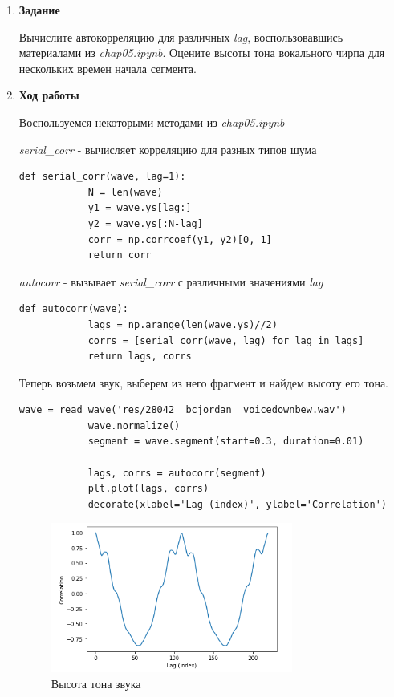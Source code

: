 \documentclass[a4paper,12pt]{article}
\begin{document}
	\begin{enumerate}
		
		
		\item \textbf{Задание}
		
		Вычислите автокорреляцию для различных \textit{lag}, воспользовавшись материалами из \textit{chap05.ipynb}. Оцените высоты тона вокального чирпа для нескольких времен начала сегмента. 
		
		\item \textbf{Ход работы}
		
		Воспользуемся некоторыми методами из \textit{chap05.ipynb}
		
		
		\textit{serial\_corr} - вычисляет корреляцию для разных типов шума 
		\begin{lstlisting}[caption=Метод serial\_corr]
			def serial_corr(wave, lag=1):
			N = len(wave)
			y1 = wave.ys[lag:]
			y2 = wave.ys[:N-lag]
			corr = np.corrcoef(y1, y2)[0, 1]
			return corr
		\end{lstlisting}
		
		\textit{autocorr} - вызывает \textit{serial\_corr} с различными значениями \textit{lag} 
		\begin{lstlisting}[caption=Метод autocorr]
			def autocorr(wave):
			lags = np.arange(len(wave.ys)//2)
			corrs = [serial_corr(wave, lag) for lag in lags]
			return lags, corrs
		\end{lstlisting}
		
		Теперь возьмем звук, выберем из него фрагмент и найдем высоту его тона.
		\begin{lstlisting}[caption=Фрагмент 1 и высота его тона]
			wave = read_wave('res/28042__bcjordan__voicedownbew.wav')
			wave.normalize()
			segment = wave.segment(start=0.3, duration=0.01)
			
			lags, corrs = autocorr(segment)
			plt.plot(lags, corrs)
			decorate(xlabel='Lag (index)', ylabel='Correlation')
		\end{lstlisting}
		\begin{figure}[H]
			\centering
			\includegraphics[width=0.75\textwidth]{1_1.png}
			\caption{Высота тона звука}
			\label{fig:1.1}
		\end{figure}
		

\end{enumerate}
\end{document}
